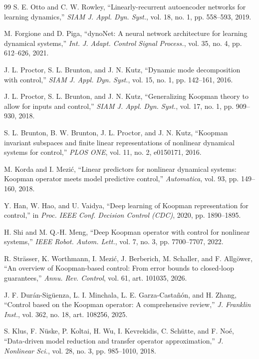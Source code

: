 ﻿\documentclass[journal]{IEEEtran}
\begin{document}
\begin{thebibliography}{99}
S. E. Otto and C. W. Rowley, ``Linearly-recurrent autoencoder networks for learning dynamics,'' \emph{SIAM J. Appl. Dyn. Syst.}, vol. 18, no. 1, pp. 558--593, 2019.

M. Forgione and D. Piga, ``dynoNet: A neural network architecture for learning dynamical systems,'' \emph{Int. J. Adapt. Control Signal Process.}, vol. 35, no. 4, pp. 612--626, 2021.

J. L. Proctor, S. L. Brunton, and J. N. Kutz, ``Dynamic mode decomposition with control,'' \emph{SIAM J. Appl. Dyn. Syst.}, vol. 15, no. 1, pp. 142--161, 2016.

J. L. Proctor, S. L. Brunton, and J. N. Kutz, ``Generalizing Koopman theory to allow for inputs and control,'' \emph{SIAM J. Appl. Dyn. Syst.}, vol. 17, no. 1, pp. 909--930, 2018.

S. L. Brunton, B. W. Brunton, J. L. Proctor, and J. N. Kutz, ``Koopman invariant subspaces and finite linear representations of nonlinear dynamical systems for control,'' \emph{PLOS ONE}, vol. 11, no. 2, e0150171, 2016.

M. Korda and I. Mezi\'c, ``Linear predictors for nonlinear dynamical systems: Koopman operator meets model predictive control,'' \emph{Automatica}, vol. 93, pp. 149--160, 2018.

Y. Han, W. Hao, and U. Vaidya, ``Deep learning of Koopman representation for control,'' in \emph{Proc. IEEE Conf. Decision Control (CDC)}, 2020, pp. 1890--1895.

H. Shi and M. Q.-H. Meng, ``Deep Koopman operator with control for nonlinear systems,'' \emph{IEEE Robot. Autom. Lett.}, vol. 7, no. 3, pp. 7700--7707, 2022.

R. Str\"asser, K. Worthmann, I. Mezi\'c, J. Berberich, M. Schaller, and F. Allg\"ower, ``An overview of Koopman-based control: From error bounds to closed-loop guarantees,'' \emph{Annu. Rev. Control}, vol. 61, art. 101035, 2026.

J. F. Dur\'an-Sig\"uenza, L. I. Minchala, L. E. Garza-Casta\~n\'on, and H. Zhang, ``Control based on the Koopman operator: A comprehensive review,'' \emph{J. Franklin Inst.}, vol. 362, no. 18, art. 108256, 2025.

S. Klus, F. N\"uske, P. Koltai, H. Wu, I. Kevrekidis, C. Sch\"utte, and F. No\'e, ``Data-driven model reduction and transfer operator approximation,'' \emph{J. Nonlinear Sci.}, vol. 28, no. 3, pp. 985--1010, 2018.


\end{thebibliography}
\end{document}
